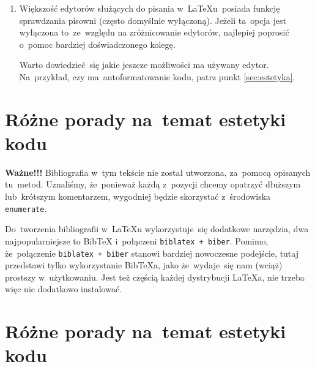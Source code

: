\documentclass[a4paper,11pt]{article}
\newcommand{\tbs}{\textbackslash}  %
\begin{document}
\begin{enumerate}
  Jakikolwiek byłby dokładny sposób działania \texttt{\tbs
    newcommand}, sprawia~on, że~czasem \LaTeX{} protestuje jeśli
  w~definicji komendy nie umieści~się w~definicji dodatkowej pary
  nawiasów wąsatych wokół argumentów: \texttt{\#numer}. Dlatego
  w~przykładach w~tym tekście zawsze taką parę umieszczamy.
\item Większość edytorów służących do pisania w~\LaTeX u~posiada
  funkcję sprawdzania pisowni (często domyślnie wyłączoną). Jeżeli
  ta~opcja jest wyłączona to~ze~względu na zróżnicowanie edytorów,
  najlepiej poprosić o~pomoc bardziej doświadczonego kolegę.

  Warto dowiedzieć~się jakie jeszcze możliwości ma używany edytor.
  Na~przykład, czy ma~autoformatowanie kodu, patrz punkt
  \eqref{sec:estetyka}.

\end{enumerate}





\section{Różne porady na~temat estetyki kodu}
\label{sec:bibliografia}

\textbf{Ważne!!!} Bibliografia w~tym tekście nie został utworzona,
za~pomocą opisanych tu~metod. Uznaliśmy, że~ponieważ każdą z~pozycji
chcemy opatrzyć dłuższym lub~krótszym komentarzem, wygodniej będzie
skorzystać z~środowiska \texttt{enumerate}.

Do~tworzenia bibliografii w~\LaTeX u wykorzystuje~się dodatkowe
narzędzia, dwa najpopularniejsze to Bib\TeX{} i~połączeni
\texttt{biblatex + biber}. Pomimo, że~połączenie \texttt{biblatex +
  biber} stanowi bardziej nowoczesne podejście, tutaj przedstawi tylko
wykorzystanie Bib\TeX a, jako że~wydaje~się nam (wciąż) prostszy
w~użytkowaniu. Jest też częścią każdej dystrybucji \LaTeX a, nie
trzeba więc nic dodatkowo instalować.





\section{Różne porady na~temat estetyki kodu}
\label{sec:estetyka}
\end{document}

